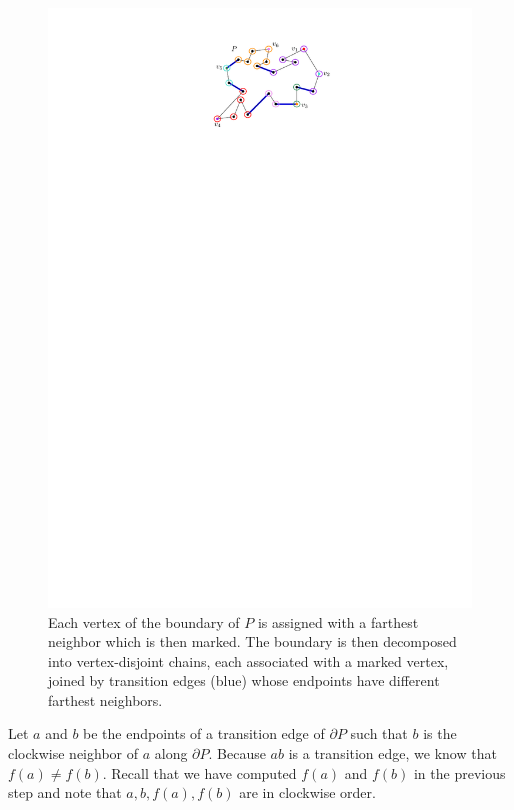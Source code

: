 \documentclass[a4paper,UKenglish]{lipics}
\newcommand{\ff}[1]{\ensuremath{f(#1)}}
\begin{document}
\begin{figure}[tb]
\centering
\includegraphics{img/MarkedVertices.pdf}

\caption{\small Each vertex of the boundary of $P$ is assigned with a farthest neighbor which is then marked. 
The boundary is then decomposed into vertex-disjoint chains, each associated with a marked vertex, joined by transition edges (blue) whose endpoints have different farthest neighbors.}
\label{fig:Marked vertices decomposition}
\end{figure}

Let $a$ and $b$ be the endpoints of a transition edge of $\partial P$ such that 
$b$ is the clockwise neighbor of $a$ along $\partial P$. Because $ab$ is a transition edge, we know that $\ff{a}\neq \ff{b}$.
Recall that we have computed $\ff{a}$ and $\ff{b}$ in the previous step and note that $a,b, \ff{a}, \ff{b}$ are in clockwise order. 
 
\end{document}

